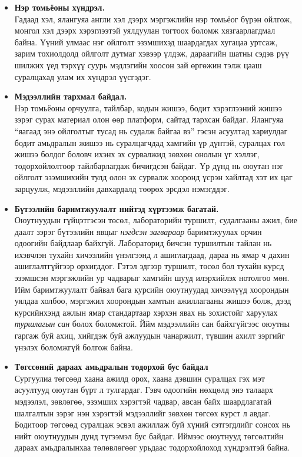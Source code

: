 \begin{itemize}[leftmargin=2em, itemsep=0.3em]

\item \textbf{Нэр томьёоны хүндрэл.}\\
Гадаад хэл, ялангуяа англи хэл дээрх мэргэжлийн нэр томьёог бүрэн ойлгож, монгол хэл дээрх хэрэглээтэй уялдуулан тогтоох боломж хязгаарлагдмал байна. Үүний улмаас нэг ойлголт эзэмшихэд шаардагдах хугацаа уртсаж, зарим тохиолдолд ойлголт дутмаг хэвээр үлдэж, дараагийн шатны сэдэв рүү шилжих үед тэрхүү суурь мэдлэгийн хоосон зай өргөжин тэлж цааш суралцахад улам их хүндрэл үүсгэдэг.
\item \textbf{Мэдээллийн тархмал байдал.}\\
Нэр томьёоны орчуулга, тайлбар, кодын жишээ, бодит хэрэглээний жишээ зэрэг сурах материал олон өөр платформ, сайтад тархсан байдаг. Ялангуяа ``яагаад энэ ойлголтыг тусад нь судалж байгаа вэ'' гэсэн асуултад хариулдаг бодит амьдралын жишээ нь суралцагчдад хамгийн үр дүнтэй, суралцах гол жишээ болдог боловч ихэнх эх сурвалжид зөвхөн онолын үг хэллэг, тодорхойлолтоор тайлбарлагдаж бичигдсэн байдаг. Үр дүнд нь оюутан нэг ойлголт эзэмшихийн тулд олон эх сурвалж хооронд үсрэн хайлтад хэт их цаг зарцуулж, мэдээллийн давхардалд төөрөх эрсдэл нэмэгддэг.

\item \textbf{Бүтээлийн баримтжуулалт нийтэд хүртээмж багатай.}\\
Оюутнуудын гүйцэтгэсэн төсөл, лабораторийн туршилт, судалгааны ажил, бие даалт зэрэг бүтээлийн явцыг \emph{нэгдсэн загвараар} баримтжуулах орчин одоогийн байдлаар байхгүй. Лабораторид бичсэн туршилтын тайлан нь ихэвчлэн тухайн хичээлийн үнэлгээнд л ашиглагдаад, дараа нь ямар ч дахин ашиглалтгүйгээр орхигддог. Гэтэл эдгээр туршилт, төсөл бол тухайн курсд эзэмшсэн мэргэжлийн ур чадварыг хамгийн шууд илэрхийлэх нотолгоо мөн. Ийм баримтжуулалт байвал бага курсийн оюутнуудад хичээлүүд хоорондын уялдаа холбоо, мэргэжил хоорондын хамтын ажиллагааны жишээ болж, дээд курсийнхэнд ажлын ямар стандартаар хэрхэн явах нь зохистойг харуулах \emph{туршлагын сан} болох боломжтой. Ййм мэдээллийн сан байхгүйгээс оюутны гаргаж буй ахиц, хийгдэж буй ажлуудын чанаржилт, түвшин ахилт зэргийг үнэлэх боломжгүй болгож байна.


\item \textbf{Төгссөний дараах амьдралын тодорхой бус байдал}\\
Сургуулиа төгсөөд хаана ажилд орох, хаана дэвшин суралцах гэх мэт асуултууд оюутан бүрт л тулгардаг. Гэвч одоогийн нөхцөлд энэ талаарх мэдээлэл, зөвлөгөө, эзэмших хэрэгтэй чадвар, авсан байх шаардлагатай шалгалтын зэрэг нэн хэрэгтэй мэдээллийг зөвхөн төгсөх курст л авдаг. Бодитоор төгсөөд суралцаж эсвэл ажиллаж буй хүний сэтгэгдлийг сонсох нь нийт оюутнуудын дунд түгээмэл бус байдаг. Иймээс оюутнууд төгсөлтийн дараах амьдралынхаа төлөвлөгөөг урьдаас тодорхойлоход хүндрэлтэй байна.
\end{itemize}

